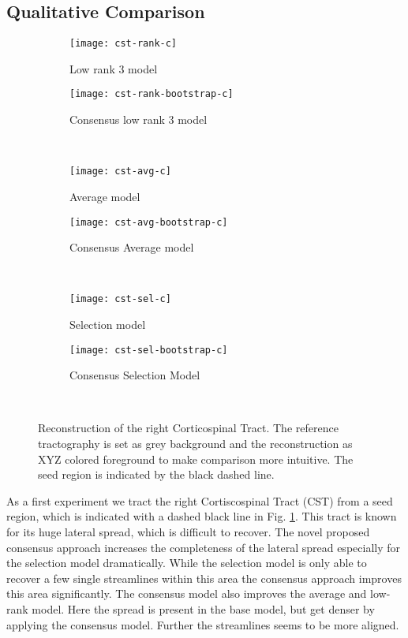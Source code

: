 \subsection{Qualitative Comparison}
\begin{figure}[t]
	\centering
	\begin{subfigure}[b]{0.45\linewidth}
		\texttt{[image: cst-rank-c]}
		\caption{Low rank 3 model}
	\end{subfigure}
	\begin{subfigure}[b]{0.45\linewidth}
		\texttt{[image: cst-rank-bootstrap-c]}
		\caption{Consensus low rank 3 model}
\end{subfigure} \\
	\begin{subfigure}[b]{0.45\linewidth}
		\texttt{[image: cst-avg-c]}
		\caption{Average model}
	\end{subfigure}
	\begin{subfigure}[b]{0.45\linewidth}
		\texttt{[image: cst-avg-bootstrap-c]}
		\caption{Consensus Average model}
\end{subfigure} \\
\begin{subfigure}[b]{0.45\linewidth}
		\texttt{[image: cst-sel-c]}
		\caption{Selection model}
	\end{subfigure}
	\begin{subfigure}[b]{0.45\linewidth}
		\texttt{[image: cst-sel-bootstrap-c]}
		\caption{Consensus Selection Model}
\end{subfigure} \\
\caption{Reconstruction of the right Corticospinal Tract. The reference
tractography is set as grey background and the reconstruction as XYZ colored
foreground to make comparison more intuitive. The seed region is indicated by
the black dashed line. }
	\label{fig:CST}
\end{figure}
As a first experiment we tract the right Cortiscospinal Tract (CST) from a seed
region, which is indicated with a dashed black line in Fig. \ref{fig:CST}. This tract is
known for its huge lateral spread, which is difficult to recover. The
novel proposed consensus approach increases the completeness of the lateral
spread especially for the selection model dramatically. While the selection
model is only able to recover a few single streamlines within this area the
consensus approach improves this area significantly. The consensus model also
improves the average and low-rank model. Here the spread is present in the base
model, but get denser by applying the consensus model. Further the streamlines
seems to be more aligned.

